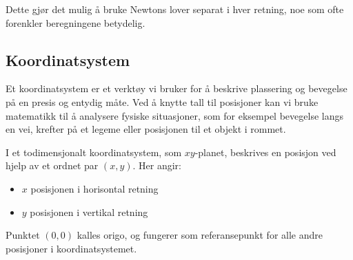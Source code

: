 Dette gjør det mulig å bruke Newtons lover separat i hver retning, noe som ofte forenkler beregningene betydelig.


\subsection{Koordinatsystem}

Et koordinatsystem er et verktøy vi bruker for å beskrive plassering og bevegelse på en presis og entydig måte. Ved å knytte tall til posisjoner kan vi bruke matematikk til å analysere fysiske situasjoner, som for eksempel bevegelse langs en vei, krefter på et legeme eller posisjonen til et objekt i rommet.\\



I et todimensjonalt koordinatsystem, som $xy$-planet, beskrives en posisjon ved hjelp av et ordnet par $(x,y)$. Her angir:
\begin{itemize}
    \item $x$ posisjonen i horisontal retning
    \item $y$ posisjonen i vertikal retning
\end{itemize}

Punktet $(0,0)$ kalles origo, og fungerer som referansepunkt for alle andre posisjoner i koordinatsystemet.


